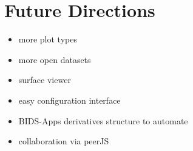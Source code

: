 \section{Future Directions}

\begin{itemize}
\item more plot types
\item more open datasets
\item surface viewer
\item easy configuration interface
\item BIDS-Apps derivatives structure to automate
\item collaboration via peerJS
\end{itemize}